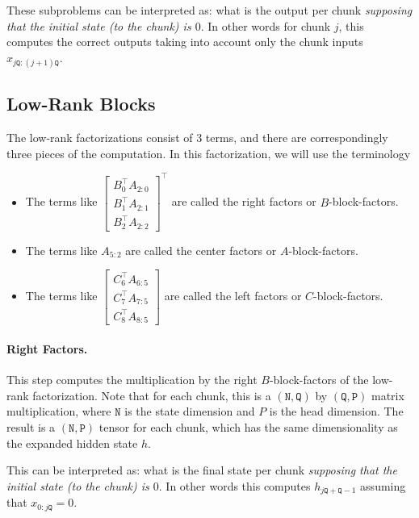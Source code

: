 These subproblems can be interpreted as: what is the output per chunk \emph{supposing that the initial state (to the chunk) is $0$}. In other words for chunk $j$, this computes the correct outputs taking into account only the chunk inputs $x_{j\mathtt{Q}:(j+1)\mathtt{Q}}$.

\subsection{Low-Rank Blocks}

The low-rank factorizations consist of 3 terms, and there are correspondingly three pieces of the computation. In this factorization, we will use the terminology

\begin{itemize}
  \item The terms like $\begin{bmatrix}B_0^{\top} A_{2:0} \\[1pt] B_1^{\top}A_{2:1} \\[1pt] B_2^{\top}A_{2:2}\end{bmatrix}^{\top}$ are called the right factors or $B$-block-factors.
  \item The terms like $A_{5:2}$ are called the center factors or $A$-block-factors.
  \item The terms like $\begin{bmatrix}C_6^{\top} A_{6:5} \\[1pt] C_7^{\top} A_{7:5} \\[1pt] C_8^{\top} A_{8:5}\end{bmatrix}$ are called the left factors or $C$-block-factors.
\end{itemize}

\paragraph{Right Factors.}

This step computes the multiplication by the right $B$-block-factors of the low-rank factorization. Note that for each chunk, this is a $(\mathtt{N}, \mathtt{Q})$ by $(\mathtt{Q}, \mathtt{P})$ matrix multiplication, where $\mathtt{N}$ is the state dimension and $P$ is the head dimension. The result is a $(\mathtt{N}, \mathtt{P})$ tensor for each chunk, which has the same dimensionality as the expanded hidden state $h$.

This can be interpreted as: what is the final state per chunk \emph{supposing that the initial state (to the chunk) is $0$}. In other words this computes $h_{j\mathtt{Q}+\mathtt{Q}-1}$ assuming that $x_{0:j\mathtt{Q}} = 0$.

